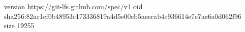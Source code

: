 version https://git-lfs.github.com/spec/v1
oid sha256:82ac1cf0b48953c173336819a4d5e00cb5aeecab4c936614e7e7ae6a0d062f96
size 19255
